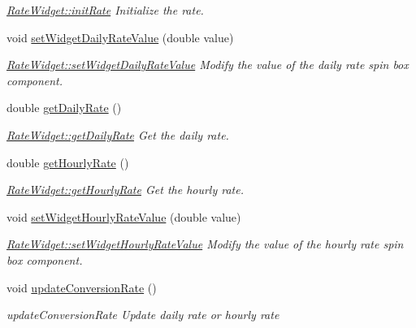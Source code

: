 \begin{DoxyCompactItemize}
\begin{DoxyCompactList}\small\item\em \hyperlink{classRateWidget_a4a3ec9a546055d6ecb3bd1a9ee8082a6}{Rate\+Widget\+::init\+Rate} Initialize the rate. \end{DoxyCompactList}\item 
void \hyperlink{classRateWidget_ab96e6867dba808a1dc5b8c327a84f93e}{set\+Widget\+Daily\+Rate\+Value} (double value)
\begin{DoxyCompactList}\small\item\em \hyperlink{classRateWidget_ab96e6867dba808a1dc5b8c327a84f93e}{Rate\+Widget\+::set\+Widget\+Daily\+Rate\+Value} Modify the {\itshape value} of the daily rate spin box component. \end{DoxyCompactList}\item 
double \hyperlink{classRateWidget_a0a72cea5ff524b47e513dcb21aea2022}{get\+Daily\+Rate} ()
\begin{DoxyCompactList}\small\item\em \hyperlink{classRateWidget_a0a72cea5ff524b47e513dcb21aea2022}{Rate\+Widget\+::get\+Daily\+Rate} Get the daily rate. \end{DoxyCompactList}\item 
double \hyperlink{classRateWidget_a50285d4472979e004c706ff5640e8227}{get\+Hourly\+Rate} ()
\begin{DoxyCompactList}\small\item\em \hyperlink{classRateWidget_a50285d4472979e004c706ff5640e8227}{Rate\+Widget\+::get\+Hourly\+Rate} Get the hourly rate. \end{DoxyCompactList}\item 
void \hyperlink{classRateWidget_a5f1061f95f2a45b88434fbdf99136030}{set\+Widget\+Hourly\+Rate\+Value} (double value)
\begin{DoxyCompactList}\small\item\em \hyperlink{classRateWidget_a5f1061f95f2a45b88434fbdf99136030}{Rate\+Widget\+::set\+Widget\+Hourly\+Rate\+Value} Modify the {\itshape value} of the hourly rate spin box component. \end{DoxyCompactList}\item 
\hypertarget{classRateWidget_a04a7bd5b186482a60c16ed4334acd83b}{void \hyperlink{classRateWidget_a04a7bd5b186482a60c16ed4334acd83b}{update\+Conversion\+Rate} ()}\label{classRateWidget_a04a7bd5b186482a60c16ed4334acd83b}

\begin{DoxyCompactList}\small\item\em update\+Conversion\+Rate Update daily rate or hourly rate \end{DoxyCompactList}\end{DoxyCompactItemize}


